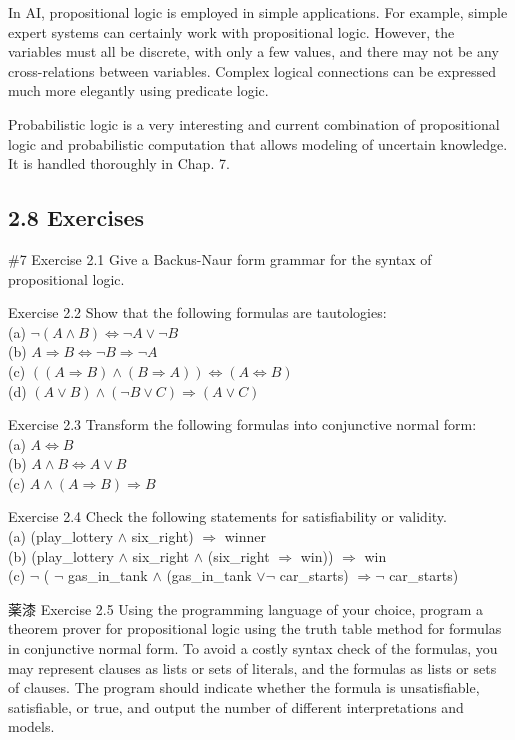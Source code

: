 \documentclass[10pt]{article}
\begin{document}
In AI, propositional logic is employed in simple applications. For example, simple expert systems can certainly work with propositional logic. However, the variables must all be discrete, with only a few values, and there may not be any cross-relations between variables. Complex logical connections can be expressed much more elegantly using predicate logic.

Probabilistic logic is a very interesting and current combination of propositional logic and probabilistic computation that allows modeling of uncertain knowledge. It is handled thoroughly in Chap. 7.

\subsection*{2.8 Exercises}
\#7 Exercise 2.1 Give a Backus-Naur form grammar for the syntax of propositional logic.

Exercise 2.2 Show that the following formulas are tautologies:\\
(a) $\neg(A \wedge B) \Leftrightarrow \neg A \vee \neg B$\\
(b) $A \Rightarrow B \Leftrightarrow \neg B \Rightarrow \neg A$\\
(c) $((A \Rightarrow B) \wedge(B \Rightarrow A)) \Leftrightarrow(A \Leftrightarrow B)$\\
(d) $(A \vee B) \wedge(\neg B \vee C) \Rightarrow(A \vee C)$

Exercise 2.3 Transform the following formulas into conjunctive normal form:\\
(a) $A \Leftrightarrow B$\\
(b) $A \wedge B \Leftrightarrow A \vee B$\\
(c) $A \wedge(A \Rightarrow B) \Rightarrow B$

Exercise 2.4 Check the following statements for satisfiability or validity.\\
(a) (play\_lottery $\wedge$ six\_right) $\Rightarrow$ winner\\
(b) (play\_lottery $\wedge$ six\_right $\wedge$ (six\_right $\Rightarrow$ win)) $\Rightarrow$ win\\
(c) $\neg$ ( $\neg$ gas\_in\_tank $\wedge$ (gas\_in\_tank $\vee \neg$ car\_starts) $\Rightarrow \neg$ car\_starts)

薬漆 Exercise 2.5 Using the programming language of your choice, program a theorem prover for propositional logic using the truth table method for formulas in conjunctive normal form. To avoid a costly syntax check of the formulas, you may represent clauses as lists or sets of literals, and the formulas as lists or sets of clauses. The program should indicate whether the formula is unsatisfiable, satisfiable, or true, and output the number of different interpretations and models.
\end{document}
